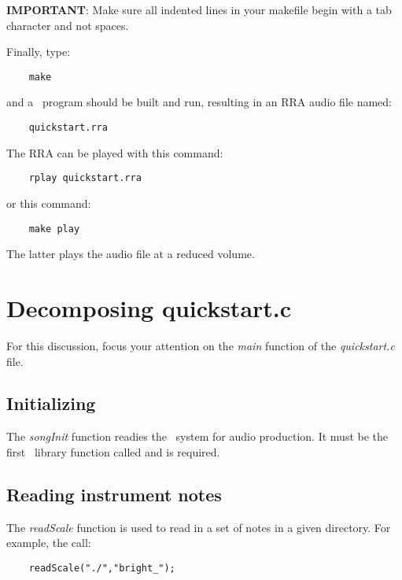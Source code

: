 \documentclass{article}
\begin{document}
{\bf IMPORTANT}:
Make sure all indented lines in your makefile begin with a tab character
and not spaces.

Finally, type:

\begin{verbatim}
    make
\end{verbatim}

and a \songlib\ program should be built and run, resulting
in an {\sc RRA} audio file named:

\begin{verbatim}
    quickstart.rra
\end{verbatim}

The {\sc RRA} can be played with this command:

\begin{verbatim}
    rplay quickstart.rra
\end{verbatim}

or this command:

\begin{verbatim}
    make play
\end{verbatim}

The latter plays the audio file at a reduced volume.

\section*{Decomposing quickstart.c}

For this discussion, focus your attention on the {\it main} function of
the {\it quickstart.c} file.

\subsection*{Initializing \songlib}

The {\it songInit} function readies the \songlib\ system for audio production.
It must be the first \songlib\ library function called and
is required.

\subsection*{Reading instrument notes}

The {\it readScale} function is used to read in a set of notes
in a given directory.
For example, the call:

\begin{verbatim}
    readScale("./","bright_");
\end{verbatim}
\end{document}
